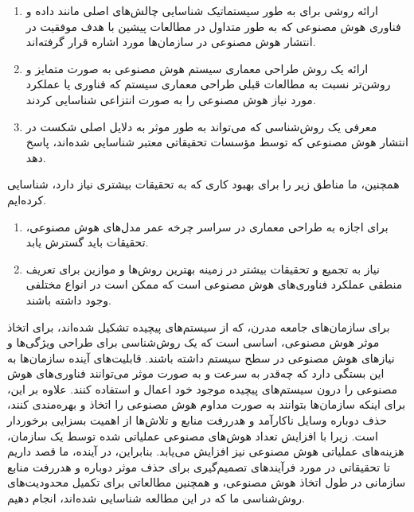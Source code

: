 \documentclass[a4paper,10pt]{article}
\begin{document}
        \begin{enumerate}
                
            \item ارائه روشی برای به طور سیستماتیک شناسایی چالش‌های اصلی مانند داده و فناوری هوش مصنوعی که به طور متداول در مطالعات پیشین با هدف موفقیت در انتشار هوش مصنوعی در سازمان‌ها مورد اشاره قرار گرفته‌اند.
    
            \item ارائه یک روش طراحی معماری سیستم هوش مصنوعی به صورت متمایز و روشن‌تر نسبت به مطالعات قبلی طراحی معماری سیستم که فناوری یا عملکرد مورد نیاز هوش مصنوعی را به صورت انتزاعی شناسایی کردند.
    
            \item معرفی یک روش‌شناسی که می‌تواند به طور موثر به دلایل اصلی شکست در انتشار هوش مصنوعی که توسط مؤسسات تحقیقاتی معتبر شناسایی شده‌اند، پاسخ دهد.
    
        \end{enumerate}

        همچنین، ما مناطق زیر را برای بهبود کاری که به تحقیقات بیشتری نیاز دارد، شناسایی کرده‌ایم.

        \begin{enumerate}
            
            \item برای اجازه به طراحی معماری در سراسر چرخه عمر مدل‌های هوش مصنوعی، تحقیقات باید گسترش یابد.

            \item نیاز به تجمیع و تحقیقات بیشتر در زمینه بهترین روش‌ها و موازین برای تعریف منطقی عملکرد فناوری‌های هوش مصنوعی است که ممکن است در انواع مختلفی وجود داشته باشند.

        \end{enumerate}

        برای سازمان‌های جامعه مدرن، که از سیستم‌های پیچیده تشکیل شده‌اند، برای اتخاذ موثر هوش مصنوعی، اساسی است که یک روش‌شناسی برای طراحی ویژگی‌ها و نیازهای هوش مصنوعی در سطح سیستم داشته باشند. قابلیت‌های آینده سازمان‌ها به این بستگی دارد که چه‌قدر به سرعت و به صورت موثر می‌توانند فناوری‌های هوش مصنوعی را درون سیستم‌های پیچیده موجود خود اعمال و استفاده کنند. علاوه بر این، برای اینکه سازمان‌ها بتوانند به صورت مداوم هوش مصنوعی را اتخاذ و بهره‌مندی کنند، حذف دوباره وسایل ناکارآمد و هدررفت منابع و تلاش‌ها از اهمیت بسزایی برخوردار است. زیرا با افزایش تعداد هوش‌های مصنوعی عملیاتی شده توسط یک سازمان، هزینه‌های عملیاتی هوش مصنوعی نیز افزایش می‌یابد. بنابراین، در آینده، ما قصد داریم تا تحقیقاتی در مورد فرآیندهای تصمیم‌گیری برای حذف موثر دوباره و هدررفت منابع سازمانی در طول اتخاذ هوش مصنوعی، و همچنین مطالعاتی برای تکمیل محدودیت‌های روش‌شناسی ما که در این مطالعه شناسایی شده‌اند، انجام دهیم.
\end{document}
